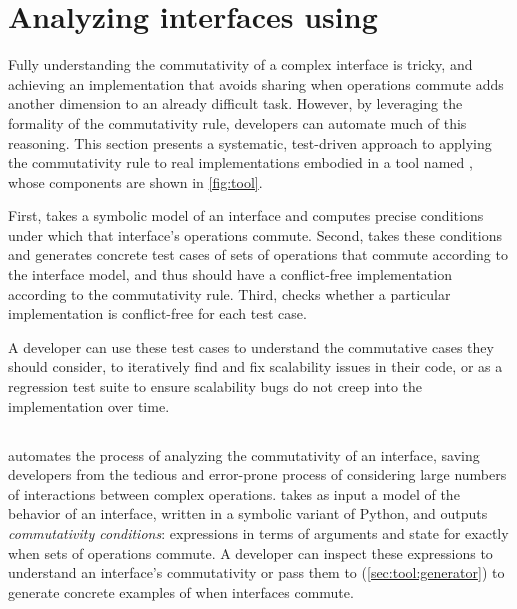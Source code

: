 \section{Analyzing interfaces using \tool}
\label{sec:tool}

Fully understanding the commutativity of a complex interface is
tricky, and achieving an
implementation that avoids sharing when operations commute adds another
dimension to an already difficult task.  However, by leveraging the
formality of the commutativity rule, developers can automate much of this
reasoning.  This section presents a systematic, test-driven approach to
applying the commutativity rule to real implementations embodied in a
tool named \tool, whose components are shown in
\cref{fig:tool}.


\begin{figure*}

\caption{The components of \tool.}
\label{fig:tool}
\end{figure*}

First, \analyzer takes a symbolic model of
an interface and computes precise conditions under which that interface's
operations commute.  Second, \testgen takes
these conditions and generates concrete test cases of sets of operations
that commute according to the interface model, and thus should
have a conflict-free implementation according to the commutativity rule.
%
Third, \mtrace checks whether a particular implementation is
conflict-free for each test case.

A developer can use these test cases to understand the
commutative cases they should consider,
to iteratively find and fix scalability
issues in their
code, or as a regression test suite to ensure
scalability bugs do not creep into the implementation over time.


\subsection{\analyzer}
\label{sec:tool:analyzer}

\analyzer automates the process of analyzing the commutativity of an
interface, saving developers from the tedious and error-prone process of
considering large numbers of interactions between complex operations.
%
\analyzer takes as input a model of the behavior of an interface,
written in a symbolic variant of Python, and outputs \emph{commutativity
  conditions}: expressions in terms of arguments and state for exactly
when sets of operations commute.
%
A developer can inspect these expressions to understand an interface's
commutativity or pass them to \testgen (\cref{sec:tool:generator})
to generate concrete examples of when interfaces commute.

